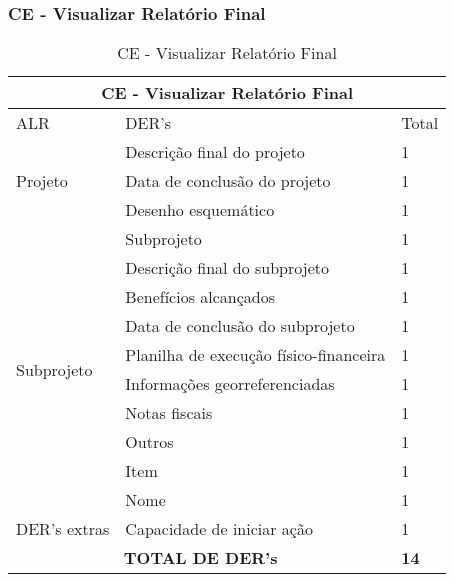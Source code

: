   \subsubsection{CE - Visualizar Relatório Final}
 \begin{table}[!h]
 \centering
  \caption{CE - Visualizar Relatório Final}
\label{ee_visualizar_relatorio_final}
\begin{tabular}{|l|l|l|}
\hline
\multicolumn{3}{|c|}{CE - Visualizar Relatório Final}                                                                 \\ \hline
ALR                           & DER's                                                & Total              \\ \hline
\multirow{3}{*}{Projeto}     & Descrição final do projeto             & 1 \\ \cline{2-3}
                             & Data de conclusão do projeto           & 1 \\ \cline{2-3}
                             & Desenho esquemático                    & 1 \\ \cline{2-3} \hline
\multirow{10}{*}{Subprojeto} & Subprojeto                             & 1 \\ \cline{2-3}
                             & Descrição final do subprojeto          & 1 \\ \cline{2-3}
                             & Benefícios alcançados                  & 1 \\ \cline{2-3}
                             & Data de conclusão do subprojeto        & 1 \\ \cline{2-3}
                             & Planilha de execução físico-financeira & 1 \\ \cline{2-3}
                             & Informações georreferenciadas          & 1 \\ \cline{2-3}
                             & Notas fiscais                          & 1 \\ \cline{2-3}
                             & Outros                                 & 1 \\ \cline{2-3}
                             & Item                                   & 1 \\ \cline{2-3}
                             & Nome                                   & 1 \\ \hline
DER's extras & Capacidade de iniciar ação             & 1 \\ \hline
\multicolumn{2}{|c|}{\textbf{TOTAL DE DER's}}                                                 & \textbf{14}                 \\ \hline
\end{tabular}
\end{table}

